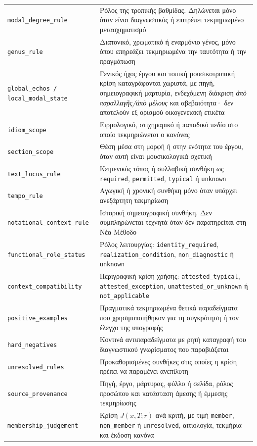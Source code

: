 \documentclass[11pt,a4paper]{article}
\begin{document}
{\begin{xltabular}{\textwidth}{@{}p{0.27\textwidth}Y@{}}
\texttt{modal\_degree\_rule} & Ρόλος της τροπικής βαθμίδας. Δηλώνεται μόνο όταν είναι διαγνωστικός ή επιτρέπει τεκμηριωμένο μετασχηματισμό\\
\texttt{genus\_rule} & Διατονικό, χρωματικό ή εναρμόνιο γένος, μόνο όπου επηρεάζει τεκμηριωμένα την ταυτότητα ή την πραγμάτωση\\
\texttt{global\_echos / local\_modal\_state} & Γενικός ήχος έργου και τοπική μουσικοτροπική κρίση καταγράφονται χωριστά, με πηγή, σημειογραφική μαρτυρία, ενδεχόμενη διάκριση \emph{ἀπὸ παραλλαγῆς/ἀπὸ μέλους} και αβεβαιότητα· δεν αποτελούν εξ ορισμού οικογενειακή ετικέτα\\
\texttt{idiom\_scope} & Ειρμολογικό, στιχηραρικό ή παπαδικό πεδίο στο οποίο τεκμηριώνεται ο κανόνας\\
\texttt{section\_scope} & Θέση μέσα στη μορφή ή στην ενότητα του έργου, όταν αυτή είναι μουσικολογικά σχετική\\
\texttt{text\_locus\_rule} & Κειμενικός τόπος ή συλλαβική συνθήκη ως \texttt{required}, \texttt{permitted}, \texttt{typical} ή \texttt{unknown}\\
\texttt{tempo\_rule} & Αγωγική ή χρονική συνθήκη μόνο όταν υπάρχει ανεξάρτητη τεκμηρίωση\\
\texttt{notational\_context\_rule} & Ιστορική σημειογραφική συνθήκη. Δεν συμπληρώνεται τεχνητά όταν δεν παρατηρείται στη Νέα Μέθοδο\\
\texttt{functional\_role\_status} & Ρόλος λειτουργίας: \texttt{identity\_required}, \texttt{realization\_condition}, \texttt{non\_diagnostic} ή \texttt{unknown}\\
\texttt{context\_compatibility} & Περιγραφική κρίση χρήσης: \texttt{attested\_typical}, \texttt{attested\_exception}, \texttt{unattested\_or\_unknown} ή \texttt{not\_applicable}\\
\texttt{positive\_examples} & Πραγματικά τεκμηριωμένα θετικά παραδείγματα που χρησιμοποιήθηκαν για τη συγκρότηση ή τον έλεγχο της υπογραφής\\
\texttt{hard\_negatives} & Κοντινά αντιπαραδείγματα με ρητή καταγραφή του διαγνωστικού γνωρίσματος που παραβιάζεται\\
\texttt{unresolved\_rules} & Προκαθορισμένες συνθήκες στις οποίες η κρίση πρέπει να παραμένει ανεπίλυτη\\
\texttt{source\_provenance} & Πηγή, έργο, μάρτυρας, φύλλο ή σελίδα, ρόλος προσώπου και κατάσταση άμεσης ή έμμεσης τεκμηρίωσης\\
\texttt{membership\_judgement} & Κρίση $J(x,T;r)$ ανά κριτή, με τιμή \texttt{member}, \texttt{non\_member} ή \texttt{unresolved}, αιτιολογία, τεκμήρια και έκδοση κανόνα\\

\end{xltabular}}
\end{document}
